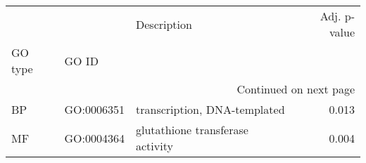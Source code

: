 \begin{longtable}{lllr}
\toprule
   &            &                       Description &  Adj. p-value \\
GO type & GO ID &                                   &               \\
\midrule
\endhead
\midrule
\multicolumn{4}{r}{{Continued on next page}} \\
\midrule
\endfoot

\bottomrule
\endlastfoot
BP & GO:0006351 &      transcription, DNA-templated &         0.013 \\
MF & GO:0004364 &  glutathione transferase activity &         0.004 \\
\end{longtable}
